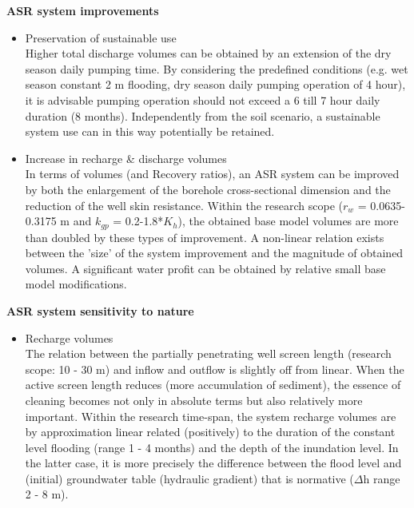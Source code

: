 \textbf{ASR system improvements}
\begin{itemize}
\item{Preservation of sustainable use} \\
Higher total discharge volumes can be obtained by an extension of the dry season daily pumping time. By considering the predefined conditions (e.g. wet season constant 2 m flooding, dry season daily pumping operation of 4 hour), it is advisable pumping operation should not exceed a 6 till 7 hour daily duration (8 months). Independently from the soil scenario, a sustainable system use can in this way potentially be retained. 
\item{Increase in recharge \& discharge volumes}\\
In terms of volumes (and Recovery ratios), an ASR system can be improved by both the enlargement of the borehole cross-sectional dimension and the reduction of the well skin resistance. Within the research scope ($r_w$ = 0.0635-0.3175 m and $k_{gp}$ = 0.2-1.8*$K_h$), the obtained base model volumes are more than doubled by these types of improvement. A non-linear relation exists between the 'size' of the system improvement and the magnitude of obtained volumes. A significant water profit can be obtained by relative small base model modifications.
\end{itemize}


\textbf{ASR system sensitivity to nature}
\begin{itemize}
\item{Recharge volumes}\\
The relation between the partially penetrating well screen length (research scope: 10 - 30 m) and inflow and outflow is slightly off from linear. When the active screen length reduces (more accumulation of sediment), the essence of cleaning becomes not only in absolute terms but also relatively more important. Within the research time-span, the system recharge volumes are by approximation linear related (positively) to the duration of the constant level flooding (range 1 - 4 months) and the depth of the inundation level. In the latter case, it is more precisely the difference between the flood level and (initial) groundwater table (hydraulic gradient) that is normative ($\Delta$h range 2 - 8 m). 
\end{itemize}

